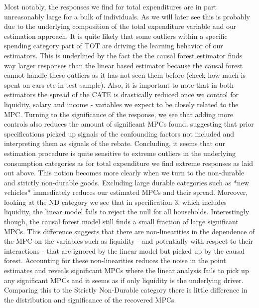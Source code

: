 Most notably, the responses we find for total expenditures are in part unreasonably large for a bulk of individuals. As we will later see this is probably due to the underlying composition of the total expenditure variable and our estimation approach. It is quite likely that some outliers within a specific spending category part of TOT are driving the learning behavior of our estimators. This is underlined by the fact the the causal forest estimator finds way larger responses than the linear based estimator because the causal forest cannot handle these outliers as it has not seen them before (check how much is spent on cars etc in test sample). Also, it is important to note that in both estimators the spread of the CATE is drastically reduced once we control for liquidity, salary and income - variables we expect to be closely related to the MPC. Turning to the significance of the response, we see that adding more controls also reduces the amount of significant MPCs found, suggesting that prior specifications picked up signals of the confounding factors not included and interpreting them as signals of the rebate. Concluding, it seems that our estimation procedure is quite sensitive to extreme outliers in the underlying consumption categories as for total expenditure we find extreme responses as laid out above. This notion becomes more clearly when we turn to the non-durable and strictly non-durable goods. Excluding large durable categories such as *new vehicles* immediately reduces our estimated MPCs and their spread. Moreover, looking at the ND category we see that in specification 3, which includes liquidity, the linear model fails to reject the null for all households. Interestingly though, the causal forest model still finds a small fraction of large significant MPCs. This difference suggests that there are non-linearities in the dependence of the MPC on the variables such as liquidity - and potentially with respect to their interactions - that are ignored by the linear model but picked up by the causal forest. Accounting for these non-linearities reduces the noise in the point estimates and reveals significant MPCs where the linear analysis fails to pick up any significant MPCs and it seems as if only liquidity is the underlying driver. Comparing this to the Strictly Non-Durable category there is little difference in the distribution and significance of the recovered MPCs.